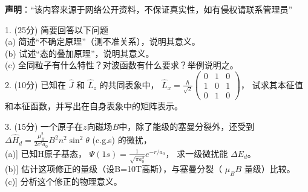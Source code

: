 
\textbf{声明}：“该内容来源于网络公开资料，不保证真实性，如有侵权请联系管理员”



1. (25分) 简要回答以下问题\\
(a) 简述“不确定原理”（测不准关系），说明其意义。\\
(b) 试述“态的叠加原理”，说明其意义。\\
(c) 全同粒子有什么特性？对波函数有什么要求？举例说明之。\\

2. (10分) 已知在 $\hat{J}$ 和 $\hat{L}_z$ 的共同表象中， $\hat{L}_x = \frac{\hbar}{\sqrt{2}} \begin{pmatrix} 
0 & 1 & 0 \\
1 & 0 & 1 \\
0 & 1 & 0 
\end{pmatrix}$， 试求其本征值和本征函数，并写出在自身表象中的矩阵表示。

3. (15分) 一个原子在$z$向磁场$B$中，除了能级的塞曼分裂外，还受到 $\Delta \hat{H}_d = \frac{\mu_B^2}{2c^2a_0} B^2 n^2 \sin^2 \theta$ (c.g.s) 的微扰，\\
(a)] 已知H原子基态， $\Psi (1s) = \frac{1}{\sqrt{\pi a_0^3}} e^{-r/a_0}$， 求一级微扰能 $ \Delta E_d$。\\
(b)] 估计这项修正的量级（设B=10T高斯），与塞曼分裂（ $\mu_B B$ 量级）比较。\\
(c)] 分析这个修正的物理意义。\\

